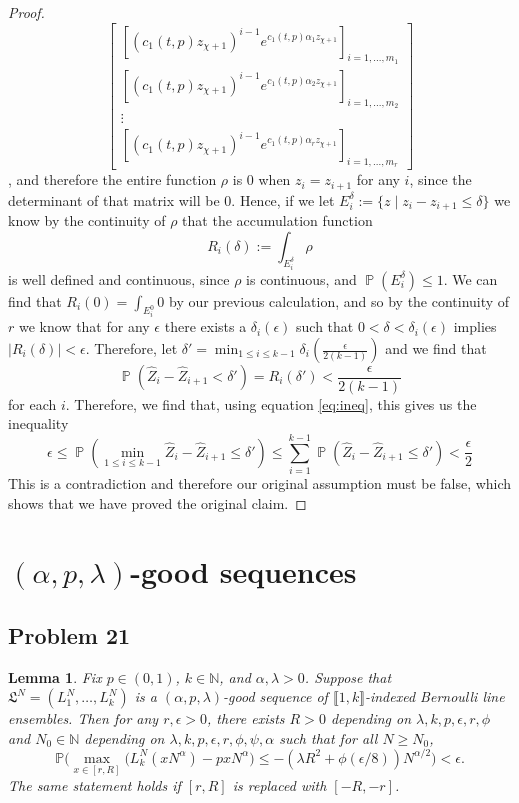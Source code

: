 \documentclass[12pt]{article}
\newtheorem{lemma}{Lemma}
\DeclareMathOperator{\pr}{\mathbb{P}}
\begin{document}
\begin{proof}
\[\begin{bmatrix}
\left[(c_1(t,p)z_{\chi+1})^{i-1}e^{c_1(t,p)\alpha_1 z_{\chi+1}}\right]_{i=1,...,m_1}\\
\left[(c_1(t,p)z_{\chi+1})^{i-1}e^{c_1(t,p)\alpha_2 z_{\chi+1}}\right]_{i=1,...,m_2}\\
\vdots \\
\left[(c_1(t,p)z_{\chi+1})^{i-1}e^{c_1(t,p)\alpha_r z_{\chi+1}}\right]_{i=1,...,m_r}
\end{bmatrix}\],
 and therefore the entire function $\rho$ is $0$ when $z_i=z_{i+1}$ for any $i$, since the determinant of that matrix will be $0$. Hence, if we let $E_i^\delta:=\{z\mid z_i-z_{i+1}\leq\delta\}$ we know by the continuity of $\rho$ that the accumulation function \[R_i(\delta):=\int_{E_i^\delta}\rho\] is well defined and continuous, since $\rho$ is continuous, and $\pr(E_i^\delta)\leq 1$. We can find that $R_i(0)=\int_{E_i^0} 0$ by our previous calculation, and so by the continuity of $r$ we know that for any $\epsilon$ there exists a $\delta_i(\epsilon)$ such that $0<\delta<\delta_i(\epsilon)$ implies $|R_i(\delta)|<\epsilon$. Therefore, let $\delta'=\min_{1\leq i\leq k-1}\delta_i\left(\frac\epsilon{2(k-1)}\right)$ and we find that \[\pr\left( \hat Z_i-\hat Z_{i+1}<\delta' \right)=R_i(\delta')<\frac{\epsilon}{2(k-1)}
\] for each $i$. Therefore, we find that, using equation \ref{eq:ineq}, this gives us the inequality 
\[\epsilon\leq \pr\left(\min_{1\leq i\leq k-1} \hat Z_i-\hat Z_{i+1}\leq\delta'\right)\leq \sum_{i=1}^{k-1}\pr\left(\hat Z_i-\hat Z_{i+1}\leq \delta'\right)< \frac{\epsilon}{2}
\]
This is a contradiction and therefore our original assumption must be false, which shows that we have proved the original claim.
\end{proof}


\section{$(\alpha, p, \lambda)$-good sequences}

\subsection*{Problem 21}

	\begin{lemma}
		Fix $p\in (0,1)$, $k\in\mathbb{N}$, and $\alpha,\lambda > 0$. Suppose that $\mathfrak{L}^N = (L_1^N, \dots, L_k^N)$ is a $(\alpha,p,\lambda)$-good sequence of $\llbracket 1, k\rrbracket$-indexed Bernoulli line ensembles. Then for any $r,\epsilon>0$, there exists $R>0$ depending on $\lambda,k,p,\epsilon,r,\phi$ and $N_0 \in \mathbb{N}$ depending on $\lambda,k,p,\epsilon,r,\phi,\psi,\alpha$ such that for all $N\geq N_0$,
		\[
		\mathbb{P}\Big(\max_{x\in[r,R]} \big(L_k^N(xN^\alpha) - pxN^\alpha\big) \leq -(\lambda R^2 + \phi(\epsilon/8))N^{\alpha/2}\Big) < \epsilon.
		\]
		The same statement holds if $[r,R]$ is replaced with $[-R,-r]$.
	\end{lemma}
\end{document}
